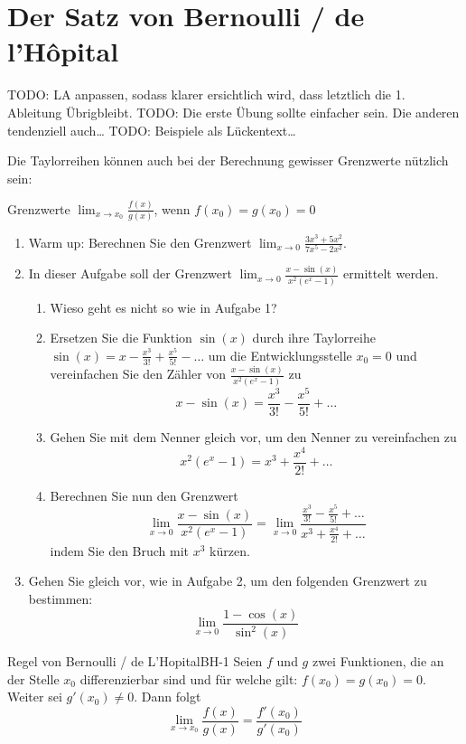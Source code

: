 \section{Der Satz von Bernoulli / de l’Hôpital}
TODO: LA anpassen, sodass klarer ersichtlich wird, dass letztlich die 1. Ableitung Übrigbleibt.
TODO: Die erste Übung sollte einfacher sein. Die anderen tendenziell auch\dots
TODO: Beispiele als Lückentext\dots

Die Taylorreihen können auch bei der Berechnung gewisser Grenzwerte nützlich sein:
\begin{LA}{Grenzwerte $\lim_{x\rightarrow x_0} \frac{f(x)}{g(x)}$, wenn $f(x_0)=g(x_0)=0$}{}
	\begin{enumerate}
		\item Warm up: Berechnen Sie den Grenzwert $\lim_{x\rightarrow 0} \frac{3x^3+5x^2}{7x^5-2x^2}$.
		\item In dieser Aufgabe soll der Grenzwert $\lim_{x\rightarrow 0} \frac{x-\sin(x)}{x^2(e^x-1)}$ ermittelt werden.
		      \begin{enumerate}
			      \item Wieso geht es nicht so wie in Aufgabe 1?
			      \item Ersetzen Sie die Funktion $\sin(x)$ durch ihre Taylorreihe $ \sin(x) = x-\frac{x^3}{3!}+\frac{x^5}{5!}- \ldots$ um die Entwicklungsstelle $x_0=0$ und vereinfachen Sie den Zähler von $\frac{x-\sin(x)}{x^2(e^x-1)}$ zu $$x-\sin(x) = \frac{x^3}{3!}-\frac{x^5}{5!}+\ldots $$
			      \item Gehen Sie mit dem Nenner gleich vor, um den Nenner zu vereinfachen zu $$x^2(e^x-1) = x^3+\frac{x^4}{2!}+\ldots $$
			      \item  Berechnen Sie nun den Grenzwert $$ \lim_{x\rightarrow 0} \frac{x-\sin(x)}{x^2(e^x-1)} = \lim_{x\rightarrow 0} \frac{\frac{x^3}{3!}-\frac{x^5}{5!}+\ldots }{ x^3+\frac{x^4}{2!}+\ldots }$$
			            indem Sie den Bruch mit $x^3$ kürzen.
		      \end{enumerate}
		\item Gehen Sie gleich vor, wie in Aufgabe 2, um den folgenden Grenzwert zu bestimmen:
		      $$ \lim_{x\rightarrow 0} \frac{1-\cos(x)}{\sin^2(x)}$$
	\end{enumerate}

\end{LA}
\clearpage
\begin{satz}
	{Regel von Bernoulli / de L'Hopital}{BH-1}
	Seien $f$ und $g$ zwei Funktionen, die an der Stelle $x_0$ differenzierbar sind und für welche gilt: $f(x_0) = g(x_0) = 0$. Weiter sei $g'(x_0) \neq 0$. Dann folgt
	\[
		\lim_{{x \to x_0}} \frac{f(x)}{g(x)} = \frac{f'(x_0)}{g'(x_0)}
	\]
\end{satz}
